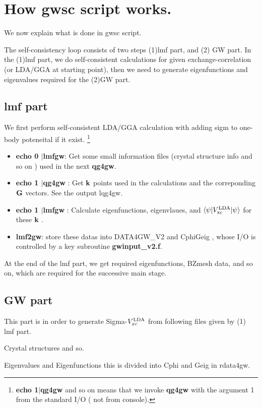 \documentclass[a4paper,10pt,epsf,fleqn]{article}
\begin{document}
\section{How gwsc script works.}
We now explain what is done in gwsc script.

The self-consistency loop consists of two steps
(1)lmf part, and (2) GW part.
In the (1)lmf part, we do self-consistent calculations for given
exchange-correlation (or LDA/GGA at starting point), then
we need to generate eigenfunctions and eigenvalues required for the
(2)GW part.

\subsection{lmf part}
We first perform self-consistent LDA/GGA calculation with adding sigm to
one-body poteneital if it exist.
\footnote{{\bf echo 1$|$qg4gw} and so on means that we invoke {\bf qg4gw} with
the argument 1 from the standard I/O ( not from console).}
\begin{itemize}
\item{\bf echo 0 $|$lmfgw}: 
  Get some small information files (crystal structure info and so on )
  used in the next {\bf qg4gw}.
\item{\bf echo 1 $|$qg4gw }: Get ${\bf k}$ points used
  in the \GW calculations and the correponding ${\bf G}$ vectors.
  See the output lqg4gw.
\item{\bf echo 1 $|$lmfgw} : 
 Calculate eigenfunctions, eigenvlaues, and
 $\langle \psi | V^{\rm LDA}_{\rm xc}| \psi \rangle$ for these ${\bf k}$ .
\item{\bf lmf2gw}: store these datas into {\sf DATA4GW\_V2} and {\sf CphiGeig} , 
whose I/O is controlled by a key subroutine {\bf gwinput\_v2.f}.
\end{itemize}

At the end of the lmf part, we get required eigenfunctions, BZmesh data, and so on,
which are required for the successive main stage.


\subsection{GW part}
This part is in order to generate Sigma-$V_{xc}^{\rm LDA}$
from following files given by (1) lmf part.

 Crystal structures and so.

 Eigenvalues and Eigenfunctions this is divided into Cphi
and Geig in rdata4gw.
\end{document}
